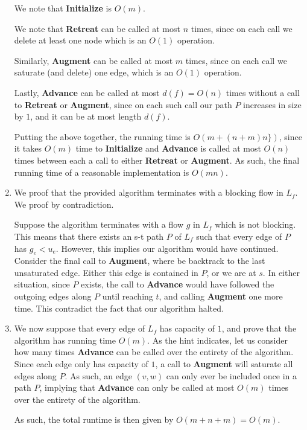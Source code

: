 \documentclass[12pt]{exam}
\begin{document}
\begin{questions}
\begin{solution}
\begin{enumerate}[label=(\alph*)]
      We note that \textbf{Initialize} is $O(m)$.

      We note that \textbf{Retreat} can be called at most $n$ times, since on each call we delete at least one node which is an $O(1)$ operation.

      Similarly, \textbf{Augment} can be called at most $m$ times, since on each call we saturate (and delete) one edge, which is an $O(1)$ operation.

      Lastly, \textbf{Advance} can be called at most $d(f) = O(n)$ times without a call to \textbf{Retreat} or \textbf{Augment}, since on each such call our path $P$ increases in size by $1$, and it can be at most length $d(f)$.

      Putting the above together, the running time is $O(m + (n + m)n\})$, since it takes $O(m)$ time to \textbf{Initialize} and \textbf{Advance} is called at most $O(n)$ times between each a call to either \textbf{Retreat} or \textbf{Augment}. As such, the final running time of a reasonable implementation is $O(mn)$.

    \item
      We proof that the provided algorithm terminates with a blocking flow in $L_f$. We proof by contradiction.

      Suppose the algorithm terminates with a flow $g$ in $L_f$ which is not blocking. This means that there exists an s-t path $P$ of $L_f$ such that every edge of $P$ has $g_e < u_e$. However, this implies our algorithm would have continued. Consider the final call to \textbf{Augment}, where be backtrack to the last unsaturated edge. Either this edge is contained in $P$, or we are at $s$. In either situation, since $P$ exists, the call to \textbf{Advance} would have followed the outgoing edges along $P$ until reaching $t$, and calling \textbf{Augment} one more time. This contradict the fact that our algorithm halted.

    \item
      We now suppose that every edge of $L_f$ has capacity of $1$, and prove that the algorithm has running time $O(m)$. As the hint indicates, let us consider how many times \textbf{Advance} can be called over the entirety of the algorithm. Since each edge only has capacity of $1$, a call to \textbf{Augment} will saturate all edges along $P$. As such, an edge $(v,w)$ can only ever be included once in a path $P$, implying that \textbf{Advance} can only be called at most $O(m)$ times over the entirety of the algorithm.

      As such, the total runtime is then given by $O(m + n + m) = O(m)$.
  \end{enumerate}
\end{solution}


\end{questions}
\end{document}
